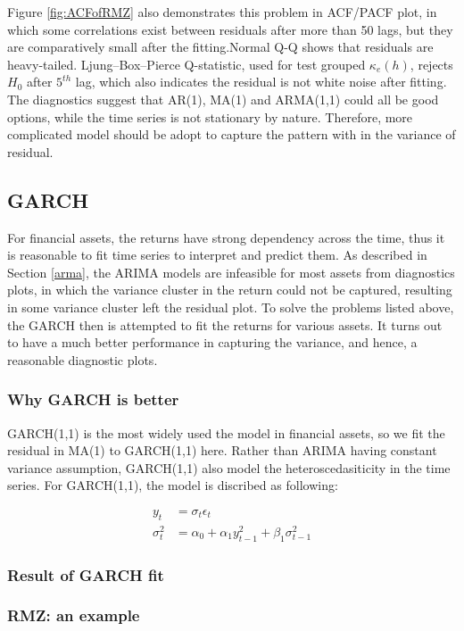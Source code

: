 \documentclass[11pt]{article}
\begin{document}
Figure \ref{fig:ACFofRMZ} also demonstrates this problem in ACF/PACF plot, in which some correlations exist between residuals after more than 50 lags, but they are comparatively small after the fitting.Normal Q-Q shows that residuals are heavy-tailed. Ljung–Box–Pierce Q-statistic, used for test grouped $\kappa_e(h)$, rejects $H_0$ after $5^{th}$ lag, which also indicates the residual is not white noise after fitting. The diagnostics suggest that AR(1), MA(1) and ARMA(1,1) could all be good options, while the time series is not stationary by nature. Therefore, more complicated model should be adopt to capture the pattern with in the variance of residual.



\subsection{GARCH}
For financial assets, the returns have strong dependency across the time, thus it is reasonable to fit time series to interpret and predict them. As described in Section \ref{arma}, the ARIMA models are infeasible for most assets from diagnostics plots, in which the variance cluster in the return could not be captured, resulting in some variance cluster left the residual plot. To solve the problems listed above, the GARCH then is attempted to fit the returns for various assets. It turns out to have a much better performance in capturing the variance, and hence, a reasonable diagnostic plots.
\subsubsection{Why GARCH is better}
GARCH(1,1) is the most widely used the model in financial assets, so we fit the residual in MA(1) to GARCH(1,1) here. Rather than ARIMA having constant variance assumption, GARCH(1,1) also model the heteroscedasiticity in the time series.  For GARCH(1,1), the model is discribed as following:

\begin{align*}
y_t & = \sigma_t \epsilon_t\\
\sigma_t^2 & = \alpha_0+ \alpha_1 y_{t-1}^2 +\beta_1\sigma_{t-1}^2
\end{align*}
\subsubsection{Result of GARCH fit}
\subsubsection{RMZ: an example}
\end{document}
